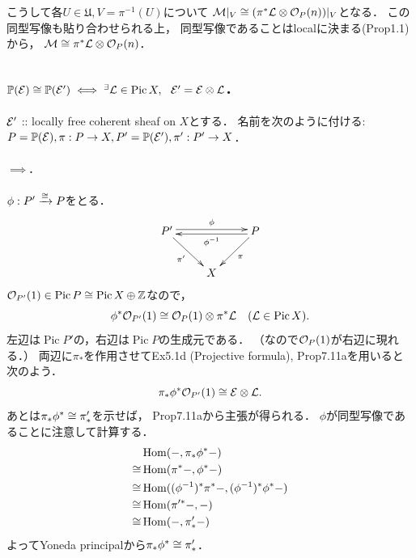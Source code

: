 \documentclass[a4paper]{jsarticle}
\newcommand{\coverU}{\mathfrak{U}}
\newcommand{\Pic}{\operatorname{Pic}}
\newcommand{\pbundle}{\mathbb{P}}
\begin{document}
    こうして各$U \in \coverU, V=\pi^{-1}(U)$について
    $\mathcal{M}|_V \cong (\pi^* \mathcal{L} \otimes \mathcal{O}_P(n))|_V$となる．
    この同型写像も貼り合わせられる上，
    同型写像であることはlocalに決まる(Prop1.1)から，
    $\mathcal{M} \cong \pi^* \mathcal{L} \otimes \mathcal{O}_P(n)$．

    \subsection{$\pbundle(\shE) \iso \pbundle(\shE') \iff
        \Exists{\shL \in \Pic X} \shE'=\shE \otimes \shL$.}
    $\mathcal{E}'$ :: locally free coherent sheaf on $X$とする．
    名前を次のように付ける:
    $P=\pbundle(\shE), \pi: P \to X, P'=\pbundle(\shE'), \pi': P' \to X$．

    \paragraph{$\implies$.}
    $\phi: P' \xrightarrow{\cong} P$をとる．
    \[
        \xymatrix
        {
            P' \ar@<2pt>[rr]^-{\phi}\ar[rd]_-{\pi'}& {} &\ar@<2pt>[ll]^-{\phi^{-1}} P \ar[ld]^-{\pi} \\
            {} & X & {}
        }
    \]
    $\shO_{P'}(1) \in \Pic P \iso \Pic X \oplus \Z$なので，
    \[ \phi^* \shO_{P'}(1) \iso \shO_P(1) \otimes \pi^* \shL ~~~(\shL \in \Pic X). \]
    左辺は$\Pic P'$の，右辺は$\Pic P$の生成元である．
    （なので$\mathcal{O}_P(1)$が右辺に現れる．）
    両辺に$\pi_*$を作用させてEx5.1d (Projective formula), Prop7.11aを用いると次のよう．
    \[ \pi_*\phi^* \mathcal{O}_{P'}(1) \cong \mathcal{E} \otimes \mathcal{L}. \]
    あとは$\pi_* \phi^* \cong \pi'_*$を示せば，
    Prop7.11aから主張が得られる．
    $\phi$が同型写像であることに注意して計算する．
    \begin{align*}
        {}&     \operatorname{Hom}(-, \pi_* \phi^* -) \\
        \cong&   \operatorname{Hom}(\pi^* -, \phi^* -) \\
        \cong&   \operatorname{Hom}((\phi^{-1})^*\pi^* -, (\phi^{-1})^*\phi^* -) \\
        \cong&   \operatorname{Hom}(\pi'^* -, -) \\
        \cong&   \operatorname{Hom}(-, \pi'_* -)
    \end{align*}
    よってYoneda principalから$\pi_* \phi^* \cong \pi'_*$．
\end{document}
